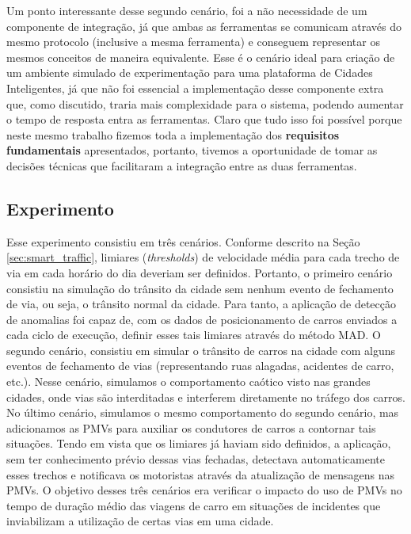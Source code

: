 Um ponto interessante desse segundo cenário, foi a não necessidade de um componente de integração, já que ambas as ferramentas se comunicam através do mesmo protocolo (inclusive a
mesma ferramenta) e conseguem representar os mesmos conceitos de maneira equivalente.
Esse é o cenário ideal para criação de um ambiente simulado de experimentação para uma plataforma de Cidades Inteligentes, já que não foi essencial a implementação desse
componente extra que, como discutido, traria mais complexidade para o sistema, podendo aumentar o tempo de resposta entra as ferramentas.
Claro que tudo isso foi possível porque neste mesmo trabalho fizemos toda a implementação dos \textbf{requisitos fundamentais} apresentados, portanto,
tivemos a oportunidade de tomar as decisões técnicas que facilitaram a integração entre as duas ferramentas.


\subsection{Experimento}

Esse experimento consistiu em três cenários.
Conforme descrito na Seção \ref{sec:smart_traffic}, limiares (\textit{thresholds}) de velocidade média para cada trecho de via em cada horário do dia deveriam ser definidos.
Portanto, o primeiro cenário consistiu na simulação do trânsito da cidade sem nenhum evento de fechamento de via, ou seja, o trânsito normal da cidade.
Para tanto, a aplicação de detecção de anomalias foi capaz de, com os dados de posicionamento de carros enviados a cada ciclo de execução, definir esses tais limiares através do método MAD.
O segundo cenário, consistiu em simular o trânsito de carros na cidade com alguns eventos de fechamento de vias (representando ruas alagadas, acidentes de carro, etc.).
Nesse cenário, simulamos o comportamento caótico visto nas grandes cidades, onde vias são interditadas e interferem diretamente no tráfego dos carros.
No último cenário, simulamos o mesmo comportamento do segundo cenário, mas adicionamos as PMVs para auxiliar os condutores de carros a contornar tais situações.
Tendo em vista que os limiares já haviam sido definidos, a aplicação, sem ter conhecimento prévio dessas vias fechadas, detectava automaticamente esses trechos e notificava os motoristas através da
atualização de mensagens nas PMVs.
O objetivo desses três cenários era verificar o impacto do uso de PMVs no tempo de duração médio das viagens de carro em situações de incidentes que inviabilizam a utilização de certas vias em uma cidade.

